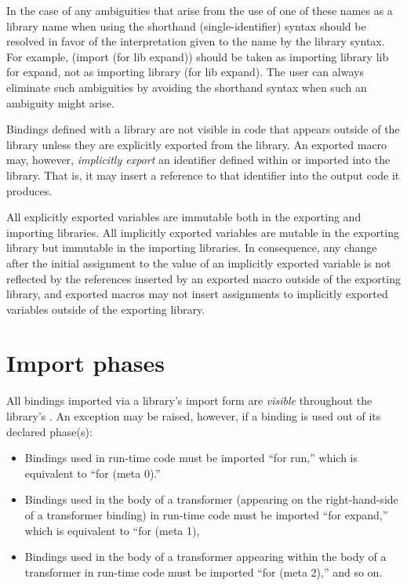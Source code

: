 In the case of any ambiguities that arise from the use of one of
these names as a library name when using the shorthand (single-identifier)
 syntax should be resolved in favor of the interpretation
given to the name by the library syntax.
For example, {\cf (import (for lib expand))} should be taken as
importing library {\cf lib} for {\cf expand}, not as importing
library {\cf (for lib expand)}.
The user can always eliminate such ambiguities by avoiding the shorthand
 syntax when such an ambiguity might arise.

Bindings defined with a library are not visible in code that appears
outside of the library unless they are explicitly exported from the
library. 
An exported macro may, however, \emph{implicitly export} an identifier
defined within or imported into the library.
That is, it may insert a reference to that identifier into the output code
it produces.

All explicitly exported variables are immutable both in the exporting and
importing libraries.
All implicitly exported variables are mutable in the exporting library but
immutable in the importing libraries.
In consequence, any change after the initial assignment to the value of an
implicitly exported variable is not reflected by the references inserted
by an exported macro outside of the exporting library, and exported macros
may not insert assignments to implicitly exported variables outside of the
exporting library.

\section{Import phases}
\label{phasessection}

All bindings imported via a library's {\cf import} form are
\emph{visible} throughout the library's .
An exception may be raised, however, if a binding is used out of its declared
phase(s):

\begin{itemize}
\item Bindings used in run-time code must be imported ``for {\cf run},''
which is equivalent to ``for {\cf (meta 0)}.''
\item Bindings used in the body of a transformer (appearing on the
right-hand-side of a transformer binding) in run-time code must be
imported ``for {\cf expand},'' which is equivalent to
``for {\cf (meta 1)},
\item Bindings used in the body of a transformer appearing within the body of a
transformer in run-time code must be imported ``for {\cf (meta 2)},''
and so on.
\end{itemize}

